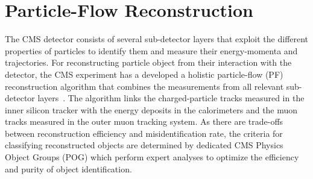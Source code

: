 
\chapter{Particle-Flow Reconstruction}
\label{Particle-Flow_Reconstruction}
The CMS detector consists of several sub-detector layers that exploit the different properties of particles to identify them and measure their energy-momenta and trajectories.
For reconstructing particle object from their interaction with the detector, the CMS experiment has a developed a holistic particle-flow (PF) reconstruction algorithm that combines the measurements from all relevant sub-detector layers~\cite{Sirunyan:2270046}.
The algorithm links the charged-particle tracks measured in the inner silicon tracker with the energy deposits in the calorimeters and the muon tracks measured in the outer muon tracking system.
As there are trade-offs between reconstruction efficiency and misidentification rate, the criteria for classifying reconstructed objects are determined by dedicated CMS Physics Object Groups (POG) which perform expert analyses to optimize the efficiency and purity of object identification.

